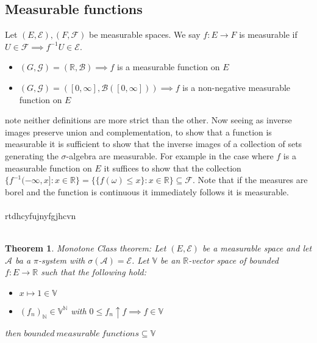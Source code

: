 \documentclass{article}
\newtheorem{theorem}{Theorem}[section]
\begin{document}
\subsection{Measurable functions}
Let $(E,\mathcal E),(F,\mathcal F)$ be measurable spaces.  We say $f:E\rightarrow F$ is measurable if $U\in\mathcal F \implies f^{-1}U\in \mathcal E$.
\begin{itemize}
  \item $(G,\mathcal G)=(\mathbb R,\mathcal B)\implies f$ is a measurable function on $E$
  \item $(G,\mathcal G)=([0,\infty],\mathcal B([0,\infty]))\implies f$ is a non-negative measurable function on $E$
\end{itemize}
note neither definitions are more strict than the other.  Now seeing as inverse images preserve union and complementation, to show that a function is measurable it is sufficient to show that the inverse images of a collection of sets generating the $\sigma$-algebra are measurable.  For example in the case where $f$ is a measurable function on $E$ it suffices to show that the collection $\{f^{-1}(-\infty,x]:x\in\mathbb R\}=\{\{f(\omega)\leq x\}:x\in\mathbb R\}\subseteq\mathcal F$.  Note that if the measures are borel and the function is continuous it immediately follows it is measurable.
\\
\\
rtdhcyfujnyfgjhcvn
\\
\\
\begin{theorem}
  Monotone Class theorem: Let $(E,\mathcal E)$ be a measurable space and let $\mathcal A$ ba a $\pi$-system with $\sigma(\mathcal A)=\mathcal E$.  Let $\mathbb V$ be an $\mathbb{R}$-vector space of bounded $f:E\rightarrow\mathbb{R}$ such that the following hold:
  \begin{itemize}
    \item $x\mapsto1\in\mathbb V$
    \item $(f_n)_\mathbb{N}\in\mathbb V^\mathbb{N}$ with $0\leq f_n \uparrow f\implies f\in\mathbb V$
  \end{itemize}
  then ${bounded~measurable~functions}\subseteq\mathbb V$
\end{theorem}
\end{document}
